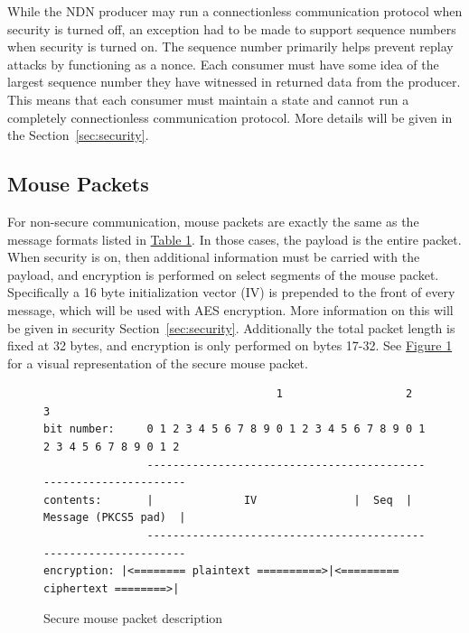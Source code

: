 \documentclass{sig-alternate}
\renewcommand\_{\textunderscore\allowbreak}  %
\begin{document}
While the NDN producer may run a connectionless communication protocol when security is turned off, an exception had to be made to support sequence numbers when security is turned on. The sequence number primarily helps prevent replay attacks by functioning as a nonce. Each consumer must have some idea of the largest sequence number they have witnessed in returned data from the producer. This means that each consumer must maintain a state and cannot run a completely connectionless communication protocol. More details will be given in the Section~\ref{sec:security}.

\subsection{Mouse Packets}
\label{sec:mousepackets}
For non-secure communication, mouse packets are exactly the same as the message formats listed in \hyperlink{tab:msgFormat}{Table 1}. In those cases, the payload is the entire packet. When security is on, then additional information must be carried with the payload, and encryption is performed on select segments of the mouse packet. Specifically a 16 byte initialization vector (IV) is prepended to the front of every message, which will be used with AES encryption. More information on this will be given in security Section~\ref{sec:security}. Additionally the total packet length is fixed at 32 bytes, and encryption is only performed on bytes 17-32. See \hyperlink{fig:mousePacketDescription}{Figure 1} for a visual representation of the secure mouse packet.

\begin{figure}
	\hypertarget{fig:mousePacketDescription}{}
\begin{lstlisting}
                                    1                   2                   3
bit number:     0 1 2 3 4 5 6 7 8 9 0 1 2 3 4 5 6 7 8 9 0 1 2 3 4 5 6 7 8 9 0 1 2
                -----------------------------------------------------------------
contents:       |              IV               |  Seq  |  Message (PKCS5 pad)  |
                -----------------------------------------------------------------
encryption:	|<======== plaintext ==========>|<========= ciphertext ========>|
\end{lstlisting}
\caption{Secure mouse packet description}
\end{figure}

\end{document}
